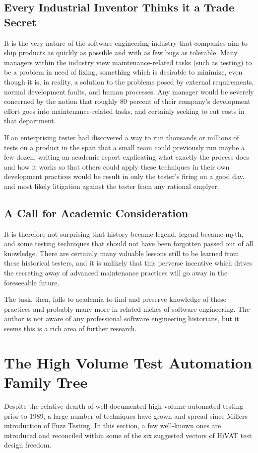 \subsection{Every Industrial Inventor Thinks it a Trade Secret}
It is the very nature of the software engineering industry that companies aim to ship products as quickly as possible and with as few bugs as tolerable. Many managers within the industry view maintenance-related tasks (such as testing) to be a problem in need of fixing, something which is desirable to minimize, even though it is, in reality, a solution to the problems posed by external requirements, normal development faults, and human processes.\citep{glass2002Facts} Any manager would be severely concerned by the notion that roughly 80 percent of their company's development effort goes into maintenance-related tasks, and certainly seeking to cut costs in that department.\citep{pigoski1996practical}

If an enterprising tester had discovered a way to run thousands or millions of tests on a product in the span that a small team could previously run maybe a few dozen, writing an academic report explicating what exactly the process does and how it works so that others could apply these techniques in their own development practices would be result in only the tester's firing on a good day, and most likely litigation against the tester from any rational emplyer.

\subsection{A Call for Academic Consideration}
It is therefore not surprising that history became legend, legend became myth, and some testing techniques that should not have been forgotten passed out of all knowledge. There are certainly many valuable lessons still to be learned from these historical testers, and it is unlikely that this perverse incentive which drives the secreting away of advanced maintenance practices will go away in the foreseeable future.

The task, then, falls to academia to find and preserve knowledge of these practices and probably many more in related niches of software engineering. The author is not aware of any professional software engineering historians, but it seems this is a rich area of further research.

\section{The High Volume Test Automation Family Tree}
Despite the relative dearth of well-documented high volume automated testing prior to 1989, a large number of techniques have grown and spread since Millers introduction of Fuzz Testing. In this section, a few well-known ones are introduced and reconciled within some of the six suggested vectors of HiVAT test design freedom.

